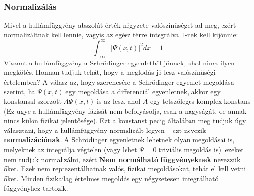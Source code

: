 \documentclass[../main.tex]{subfiles}
\begin{document}
\subsubsection{Normalizálás}
Mivel a hullámfüggvény abszolút érték négyzete valószínűséget ad meg, ezért normalizáltnak kell lennie, vagyis az egész térre integrálva 1-nek kell kijönnie:
\begin{equation}
    \boxed{\int_{-\infty}^{\infty} |\Psi(x,t)|^2 dx = 1}
\end{equation}
Viszont a hullámfüggvény a Schrödinger egyenletből jönnek, ahol nincs ilyen megkötés. Honnan tudjuk tehát, hogy a meglodás jó lesz valószínűségi értelemben? A válasz az, hogy szerencsére a Schrödinger egyenlet megoldása szerint,
ha $\Psi(x,t)$ egy megoldása a differenciál egyenletnek, akkor egy konstansal szorzott $A \Psi(x,t)$ is az lesz, ahol $A$ egy tetszőleges komplex konstans (Ez ugye a hullámfüggvény fázisát nem befolyásolja, csak a nagyságát, de annak nincs külön fizikai jelentősége). Ezt a konstanst pedig általában meg tudjuk úgy választani,
hogy a hullámfüggvény normalizált legyen -- ezt nevezik \textbf{normalizációnak}. A Schrödinger egyenletnek lehetnek olyan megoldásai is, melyeknek az integrálja végtelen (vagy lehet $\Psi = 0$ triviális megoldás is),
ezeket nem tudjuk normalizálni, ezért \textbf{Nem normálható függvényeknek} nevezzük őket. Ezek nem reprezentálhatnak valós, fizikai megoldásokat, tehát el kell vetni őket. Minden fizikailag értelmes megoldás
egy négyzetesen integrálható függvényhez tartozik. 
\end{document}
